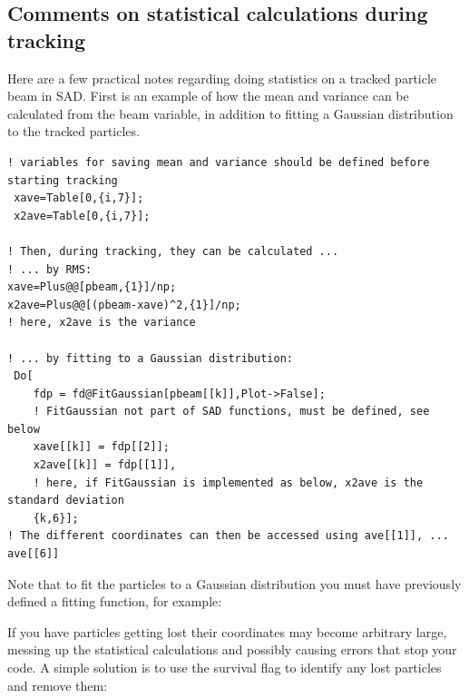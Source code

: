 \documentclass{article}
\begin{document}
\subsection{Comments on statistical calculations during tracking}
Here are a few practical notes regarding doing statistics on a tracked particle beam in SAD. First is an example of how the mean and variance can be calculated from the beam variable, in addition to fitting a Gaussian distribution to the tracked particles. 

\begin{lstlisting}
! variables for saving mean and variance should be defined before starting tracking
 xave=Table[0,{i,7}];
 x2ave=Table[0,{i,7}];

! Then, during tracking, they can be calculated ...
! ... by RMS:
xave=Plus@@[pbeam,{1}]/np;
x2ave=Plus@@[(pbeam-xave)^2,{1}]/np;
! here, x2ave is the variance

! ... by fitting to a Gaussian distribution:
 Do[
    fdp = fd@FitGaussian[pbeam[[k]],Plot->False];
    ! FitGaussian not part of SAD functions, must be defined, see below
    xave[[k]] = fdp[[2]];
    x2ave[[k]] = fdp[[1]],
    ! here, if FitGaussian is implemented as below, x2ave is the standard deviation
    {k,6}];
! The different coordinates can then be accessed using ave[[1]], ... ave[[6]]
\end{lstlisting}
Note that to fit the particles to a Gaussian distribution you must have previously defined a fitting function, for example:


If you have particles getting lost their coordinates may become arbitrary large, messing up the statistical calculations and possibly causing errors that stop your code. A simple solution is to use the survival flag to identify any lost particles and remove them:


\end{document}
